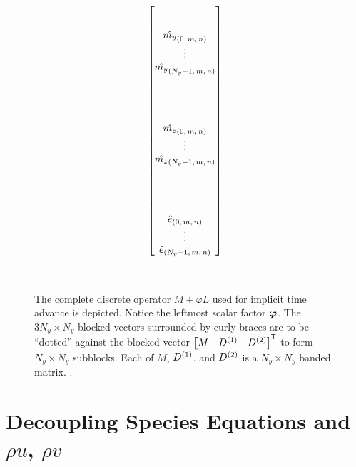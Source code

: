 \begin{sidewaysfigure}
{{\begin{minipage}[c]{\textwidth}
\begin{align*}
\begin{bmatrix}
\\%
\\%
  \hat{\my}_{\left(0,\,m,\,n\right)} \\
  \vdots \\
  \hat{\my}_{\left(N_y-1,\,m,\,n\right)} \\
\\%
\\%
\\%
\\%
  \hat{\mz}_{\left(0,\,m,\,n\right)} \\
  \vdots \\
  \hat{\mz}_{\left(N_y-1,\,m,\,n\right)} \\
\\%
\\%
\\%
\\%
  \hat{e}_{\left(0,\,m,\,n\right)} \\
  \vdots \\
  \hat{e}_{\left(N_y-1,\,m,\,n\right)} \\
%
\end{bmatrix}
\end{align*}
\end{minipage}}}  %
\vspace{2em}
\\
\caption[The discrete operator $M+\varphi{}L$ used for implicit time advance]
{
    The complete discrete operator $M+\varphi{}L$ used for implicit time advance is
    depicted.  Notice the leftmost scalar factor $\bm{\varphi}$.  The $3 N_y \times
    N_y$ blocked vectors surrounded by curly braces are to be ``dotted'' against
    the blocked vector $ {\begin{bmatrix} M & D^{(1)} & D^{(2)} \end{bmatrix}}^{\mathsf{T}} $
    to form $N_y \times N_y$ subblocks.  Each of $M$, $D^{(1)}$, and $D^{(2)}$ is a
    $N_y \times N_y$ banded matrix. .
}
\label{fig:discreteimplicitop}
\end{sidewaysfigure}

\newpage
\section{Decoupling Species Equations and $\rho u$, $\rho v$}

